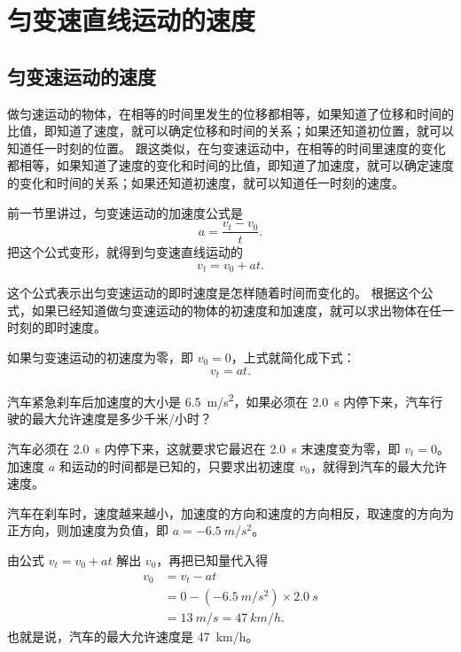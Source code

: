 \section{匀变速直线运动的速度}
\subsection{匀变速运动的速度}
做匀速运动的物体，在相等的时间里发生的位移都相等，如果知道了位移和时间的比值，即知道了速度，就可以确定位移和时间的关系；如果还知道初位置，就可以知道任一时刻的位置。
跟这类似，在匀变速运动中，在相等的时间里速度的变化都相等，如果知道了速度的变化和时间的比值，即知道了加速度，就可以确定速度的变化和时间的关系；如果还知道初速度，就可以知道任一时刻的速度。

前一节里讲过，匀变速运动的加速度公式是
\[a=\frac{v_t-v_0}{t}.\]
把这个公式变形，就得到匀变速直线运动的
\[v_t=v_0+at.\]

这个公式表示出匀变速运动的即时速度是怎样随着时间而变化的。
根据这个公式，如果已经知道做匀变速运动的物体的初速度和加速度，就可以求出物体在任一时刻的即时速度。

如果匀变速运动的初速度为零，即 $v_0=0$，上式就简化成下式：
\[v_t=at.\]

\begin{example}
汽车紧急刹车后加速度的大小是 \qty{6.5}{m/s^2}，如果必须在 \qty{2.0}{s} 内停下来，汽车行驶的最大允许速度是多少千米/小时？
\end{example}

\begin{solution}
汽车必须在 \qty{2.0}{s} 内停下来，这就要求它最迟在 \qty{2.0}{s} 末速度变为零，即 $v_t=0$。加速度 $a$ 和运动的时间都是已知的，只要求出初速度 $v_0$，就得到汽车的最大允许速度。

汽车在刹车时，速度越来越小，加速度的方向和速度的方向相反，取速度的方向为正方向，则加速度为负值，即 $a= \qty{-6.5}{m/s^2}$。

由公式 $v_t=v_0+at$ 解出 $v_0$，再把已知量代入得
\[\begin{split}
v_0&=v_t-at\\
&=0-(\qty{-6.5}{m/s^2})\times \qty{2.0}{s}\\
&=\qty{13}{m/s}=\qty{47}{km/h}.
\end{split} \]
也就是说，汽车的最大允许速度是 \qty{47}{km/h}。
\end{solution}

